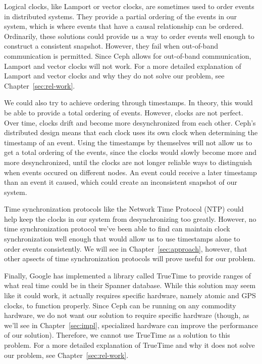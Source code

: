 Logical clocks, like Lamport or vector clocks, are sometimes used to order 
events in distributed systems. They provide a partial ordering of the events in our system, which is
where events that have a causal relationship can be ordered. Ordinarily, these solutions could provide us a way to order events well enough to construct a consistent snapshot. However, they fail when
out-of-band communication is permitted. Since Ceph allows for out-of-band 
communication, Lamport and vector clocks will not work. For a more detailed explanation
of Lamport and vector clocks and why they do not solve our problem, see 
Chapter~\ref{sec:rel-work}.

We could also try to achieve ordering through timestamps. In theory,
this would be able to provide a total ordering of events. However, clocks are not perfect. Over time, clocks drift and become more desynchronized from each other. Ceph's distributed design means that each clock uses its own clock
when determining the timestamp of an event. Using the timestamps by themselves
will not allow us to get a total ordering of the events, since the clocks
would slowly become more and more desynchronized, until the clocks are not 
longer reliable ways to distinguish when events occured on different nodes. An 
event could receive a later timestamp than an event it caused, which could 
create an inconsistent snapshot of our system. 

Time synchronization protocols like the Network Time Protocol (NTP) could help
keep the clocks in our system from desynchronizing too greatly. However, no
time synchronization protocol we've been able to find can maintain 
clock synchronization well enough that would allow us to use timestamps alone
to order events consistently. We will see in Chapter~\ref{sec:approach}, 
however, that other apsects of time synchronization protocols will prove useful
for our problem.

Finally, Google has implemented a library called TrueTime to provide ranges of 
what real time could be in their Spanner database. While this solution may seem like
it could work, it actually requires specific hardware, namely atomic and GPS
clocks, to function properly. Since Ceph can be running on any commodity hardware, we do
not want our solution to require specific hardware (though, as we'll see in 
Chapter~\ref{sec:impl}, specialized hardware can improve the performance of
our solution). Therefore, we cannot use TrueTime as a solution to this 
problem. For a more detailed explanation of TrueTime and why it does not solve 
our problem, see Chapter~\ref{sec:rel-work}.














